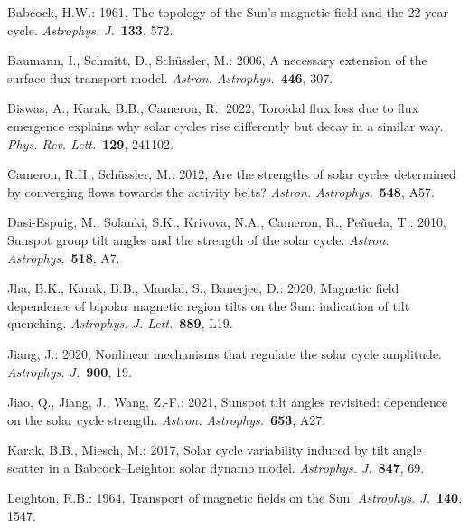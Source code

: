 \documentclass[namedreferences,hyperref,optionalrh,solaromanenum]{spr-sola}
\newcommand{\aap}{{\it Astron. Astrophys.}}
\newcommand{\apj}{{\it Astrophys. J.}}
\newcommand{\apjl}{{\it Astrophys. J. Lett.}}
\newcommand{\prl}{{\it Phys. Rev. Lett.}}
\begin{document}

\begin{thebibliography}{}

Babcock, H.W.: 1961, The topology of the Sun's magnetic field and the
22-year cycle. \apj\ {\bf 133}, 572.

Baumann, I., Schmitt, D., Sch\"ussler, M.: 2006, A necessary extension of
the surface flux transport model. \aap\ {\bf 446}, 307.

Biswas, A., Karak, B.B., Cameron, R.: 2022, Toroidal flux loss due to
flux emergence explains why solar cycles rise differently but decay in a
similar way. \prl\ {\bf 129}, 241102.

Cameron, R.H., Sch\"ussler, M.: 2012, Are the strengths of solar cycles
determined by converging flows towards the activity belts? \aap\
{\bf 548}, A57.

Dasi-Espuig, M., Solanki, S.K., Krivova, N.A., Cameron, R.,
Pe\~nuela, T.: 2010, Sunspot group tilt angles and the strength of the
solar cycle. \aap\ {\bf 518}, A7.

Jha, B.K., Karak, B.B., Mandal, S., Banerjee, D.: 2020, Magnetic field
dependence of bipolar magnetic region tilts on the Sun: indication of
tilt quenching. \apjl\ {\bf 889}, L19.

Jiang, J.: 2020, Nonlinear mechanisms that regulate the solar cycle
amplitude. \apj\ {\bf 900}, 19.

Jiao, Q., Jiang, J., Wang, Z.-F.: 2021, Sunspot tilt angles revisited:
dependence on the solar cycle strength. \aap\ {\bf 653}, A27.

Karak, B.B., Miesch, M.: 2017, Solar cycle variability induced by tilt
angle scatter in a Babcock--Leighton solar dynamo model. \apj\
{\bf 847}, 69.

Leighton, R.B.: 1964, Transport of magnetic fields on the Sun. \apj\
{\bf 140}, 1547.


\end{thebibliography}
\end{document}
